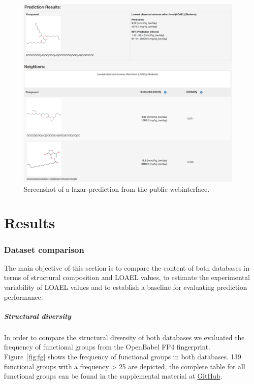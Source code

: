 \documentclass[]{achemso}
\let\oldsubparagraph\subparagraph
\renewcommand{\subparagraph}[1]{\oldsubparagraph{#1}\mbox{}}
\begin{document}
\begin{figure}
\centering
\includegraphics{figures/lazar-screenshot.pdf}
\caption{Screenshot of a lazar prediction from the public
webinterface.}\label{fig:screenshot}
\end{figure}

\section{Results}\label{results}

\subsubsection{Dataset comparison}\label{dataset-comparison}

The main objective of this section is to compare the content of both
databases in terms of structural composition and LOAEL values, to
estimate the experimental variability of LOAEL values and to establish a
baseline for evaluating prediction performance.

\subparagraph{Structural diversity}\label{structural-diversity}

In order to compare the structural diversity of both databases we
evaluated the frequency of functional groups from the OpenBabel FP4
fingerprint. Figure~\ref{fig:fg} shows the frequency of functional
groups in both databases. 139 functional groups with a frequency
\textgreater{} 25 are depicted, the complete table for all functional
groups can be found in the supplemental material at
\href{https://github.com/opentox/loael-paper/blob/submission/data/functional-groups.csv}{GitHub}.
\end{document}
